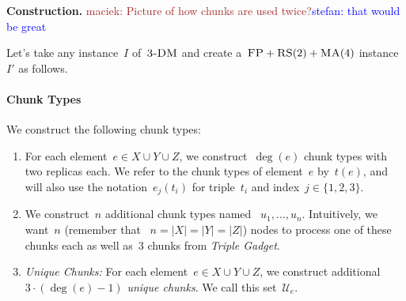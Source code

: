 \documentclass[preprint,12pt]{elsarticle}
\newcommand{\maciek}[1]{\textcolor{brown}{maciek: #1}}
\newcommand{\stefan}[1]{\textcolor{blue}{stefan: #1}}
\newcommand{\FP}{\textsc{FP}}
\newcommand{\RS}{\textsc{RS}}
\newcommand{\MA}{\textsc{MA}}
\newcommand{\TripleGadget}{{\emph{Triple Gadget}}}
\newcommand{\UniqueE}{{\ensuremath{\mathcal{U}_e}}}
\newcommand{\TDM}{\textsc{3-DM}}
\begin{document}
\textbf{Construction.}  \maciek{Picture of how chunks are used
  twice?}\stefan{that would be great}

Let's take any instance~$I$ of~$\TDM$ and create a~$\FP+\RS(2)+\MA(4)$
instance~$I'$ as follows.

\paragraph{Chunk Types}
We construct the following chunk types:
\begin{enumerate}
  \item For each element~$e\in X\cup Y\cup Z$, we construct~$\deg(e)$
  chunk types with two replicas each.  We refer to the chunk types of
  element~$e$ by~$t(e)$, and will also use the notation~$e_j(t_i)$ for
  triple~$t_i$ and index~$j \in \{1,2,3\}$.
  \item We construct~$n$ additional chunk types named
 ~$u_1, \ldots, u_n$.  Intuitively, we want~$n$ (remember that
 ~$n=|X|=|Y|=|Z|$) nodes to process one of these chunks each as well
  as~$3$ chunks from \TripleGadget.
  \item \emph{Unique Chunks:} For each element~$e\in X\cup Y\cup Z$,
  we construct additional~$3\cdot(\deg(e) - 1)$ \emph{unique chunks}.
  We call this set~$\UniqueE$.
\end{enumerate}
\end{document}
